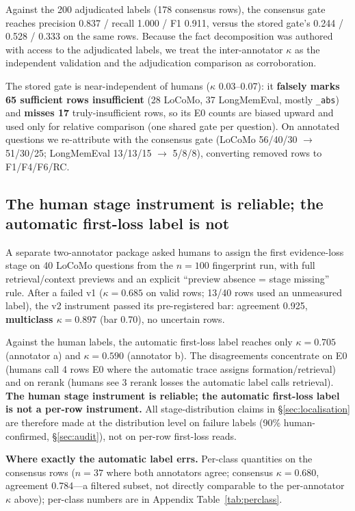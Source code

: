 \documentclass[11pt]{article}
\begin{document}
Against the 200 adjudicated labels (178 consensus rows), the consensus gate
reaches precision 0.837 / recall 1.000 / F1 0.911, versus the stored gate's
0.244 / 0.528 / 0.333 on the same rows. Because the fact decomposition was
authored with access to the adjudicated labels, we treat the inter-annotator
$\kappa$ as the independent validation and the adjudication comparison as
corroboration.

The stored gate is near-independent of humans ($\kappa$ 0.03--0.07): it
\textbf{falsely marks 65 sufficient rows insufficient} (28 LoCoMo, 37
LongMemEval, mostly \texttt{\_abs}) and \textbf{misses 17} truly-insufficient
rows, so its E0 counts are biased upward and used only for relative comparison
(one shared gate per question). On annotated questions we re-attribute with
the consensus gate (LoCoMo 56/40/30 $\to$ 51/30/25; LongMemEval 13/13/15 $\to$
5/8/8), converting removed rows to F1/F4/F6/RC.

\subsection{The human stage instrument is reliable; the automatic first-loss label is not}
\label{sec:audit:stage}

A separate two-annotator package asked humans to assign the first
evidence-loss stage on 40 LoCoMo questions from the $n{=}100$ fingerprint run,
with full retrieval/context previews and an explicit ``preview absence = stage
missing'' rule. After a failed v1 ($\kappa = 0.685$ on valid rows; 13/40 rows
used an unmeasured label), the v2 instrument passed its pre-registered bar:
agreement 0.925, \textbf{multiclass $\kappa = 0.897$} (bar 0.70), no uncertain
rows.

Against the human labels, the automatic first-loss label reaches only
$\kappa = 0.705$ (annotator a) and $\kappa = 0.590$ (annotator b). The
disagreements concentrate on E0 (humans call 4 rows E0 where the automatic
trace assigns formation/retrieval) and on rerank (humans see 3 rerank losses
the automatic label calls retrieval). \textbf{The human stage instrument is
reliable; the automatic first-loss label is not a per-row instrument.} All
stage-distribution claims in \S\ref{sec:localisation} are therefore made at
the distribution level on failure labels (90\% human-confirmed,
\S\ref{sec:audit}), not on per-row first-loss reads.

\textbf{Where exactly the automatic label errs.} Per-class quantities on the
consensus rows ($n = 37$ where both annotators agree; consensus
$\kappa = 0.680$, agreement 0.784---a filtered subset, not directly
comparable to the per-annotator $\kappa$ above); per-class numbers are in
Appendix Table~\ref{tab:perclass}.
\end{document}
